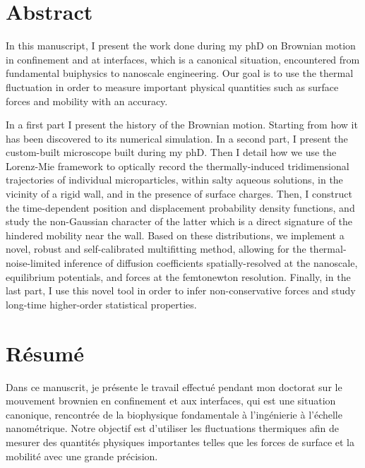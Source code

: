 \section*{Abstract}

In this manuscript, I present the work done during my phD on Brownian motion in confinement and at interfaces, which is a canonical situation, encountered from fundamental buiphysics to nanoscale engineering. Our goal is to use the thermal fluctuation in order to measure important physical quantities such as surface forces and mobility with an accuracy.

In a first part I present the history of the Brownian motion. Starting from how it has been discovered to its numerical simulation. In a second part, I present the custom-built microscope built during my phD. Then I detail how we use the Lorenz-Mie framework to optically record the thermally-induced tridimensional trajectories of individual microparticles, within salty aqueous solutions, in the vicinity of a rigid wall, and in the presence of surface charges. Then, I construct the time-dependent position and displacement probability density functions, and study the non-Gaussian character of the latter which is a direct signature of the hindered mobility near the wall. Based on these distributions, we implement a novel, robust and self-calibrated multifitting method, allowing for the thermal-noise-limited inference of diffusion coefficients spatially-resolved at the nanoscale, equilibrium potentials, and forces at the femtonewton resolution. Finally, in the last part, I use this novel tool in order to infer non-conservative forces and study long-time higher-order statistical properties.


\section*{Résumé}

Dans ce manuscrit, je présente le travail effectué pendant mon doctorat sur le mouvement brownien en confinement et aux interfaces, qui est une situation canonique, rencontrée de la biophysique fondamentale à l'ingénierie à l'échelle nanométrique.  Notre objectif est d'utiliser les fluctuations thermiques afin de mesurer des quantités physiques importantes telles que les forces de surface et la mobilité avec une grande précision.


